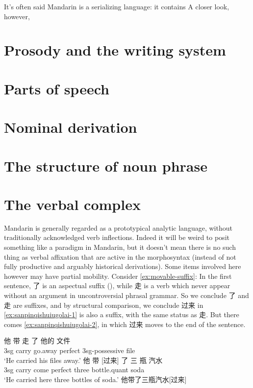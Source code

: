 \documentclass[UTF8, a4paper, oneside, scheme=plain]{ctexrep}
\newcommand{\translate}[1]{`#1'}
\begin{document}
It's often said Mandarin is a serializing language:
it contains 
A closer look, however, 

\chapter{Prosody and the writing system}

\chapter{Parts of speech}

\chapter{Nominal derivation}

\chapter{The structure of noun phrase}

\chapter{The verbal complex}

Mandarin is generally regarded as a prototypical analytic language,
without traditionally acknowledged verb inflections.
Indeed it will be weird to posit something like a paradigm in Mandarin,
but it doesn't mean there is no such thing as verbal affixation that are active
in the morphosyntax 
(instead of not fully productive and arguably historical derivations).
Some items involved here however may have partial mobility.
Consider \eqref{ex:movable-suffix}:
In the first sentence, 
了 is an aspectual suffix (),
while 走 is a verb which never appear without an argument in uncontroversial phrasal grammar.
So we conclude 了 and 走 are suffixes,
and by structural comparison, 
we conclude 过来 in \eqref{ex:sanpinqishuiugolai-1} 
is also a suffix, with the same status as 走.
But there comes \eqref{ex:sanpinqishuiugolai-2},
in which 过来 moves to the end of the sentence.

\begin{exe}
    \ex \begin{xlist}
        \ex \gll 他 带 走 了 他的 文件  \\ 
        3sg carry go.away \acs{perfect} 3sg-\acs{possessive} file \\
        \glt \translate{He carried his files away.}
        \ex \gll 他 带 [过来] 了 三 瓶 汽水 \\
        3sg carry come \acs{perfect} three bottle.\acs{quant} soda \\
        \glt \translate{He carried here three bottles of soda.} 
        \label{ex:sanpinqishuiugolai-1}
        \ex 他带了三瓶汽水[过来]
        \label{ex:sanpinqishuiugolai-2}
    \end{xlist}
    \label{ex:movable-suffix}
\end{exe}
\end{document}
